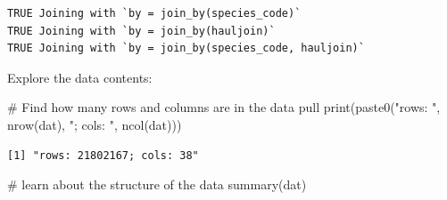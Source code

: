 \documentclass[
  letterpaper,
  oneside,
  open=any]{scrbook}
\newenvironment{Shaded}{\begin{snugshade}}{\end{snugshade}}
\newcommand{\CommentTok}[1]{\textcolor[rgb]{0.37,0.37,0.37}{#1}}
\newcommand{\FunctionTok}[1]{\textcolor[rgb]{0.28,0.35,0.67}{#1}}
\newcommand{\NormalTok}[1]{\textcolor[rgb]{0.00,0.23,0.31}{#1}}
\newcommand{\StringTok}[1]{\textcolor[rgb]{0.13,0.47,0.30}{#1}}
\begin{document}
\begin{verbatim}
TRUE Joining with `by = join_by(species_code)`
TRUE Joining with `by = join_by(hauljoin)`
TRUE Joining with `by = join_by(species_code, hauljoin)`
\end{verbatim}

Explore the data contents:

\begin{Shaded}
\begin{Highlighting}[]
\CommentTok{\# Find how many rows and columns are in the data pull}
\FunctionTok{print}\NormalTok{(}\FunctionTok{paste0}\NormalTok{(}\StringTok{"rows: "}\NormalTok{, }\FunctionTok{nrow}\NormalTok{(dat), }\StringTok{"; cols: "}\NormalTok{, }\FunctionTok{ncol}\NormalTok{(dat)))}
\end{Highlighting}
\end{Shaded}

\begin{verbatim}
[1] "rows: 21802167; cols: 38"
\end{verbatim}

\begin{Shaded}
\begin{Highlighting}[]
\CommentTok{\# learn about the structure of the data}
\FunctionTok{summary}\NormalTok{(dat)}
\end{Highlighting}
\end{Shaded}
\end{document}
